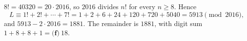 $8!=40320=20\cdot2016$, so $2016$ divides $n!$ for every $n\ge8$. Hence
\[
L\equiv1!+2!+\cdots+7!=1+2+6+24+120+720+5040=5913\pmod{2016},
\]
and $5913-2\cdot2016=1881$. The remainder is $1881$, with digit sum $1+8+8+1=\boxed{\textbf{(f)}\ 18}$.
